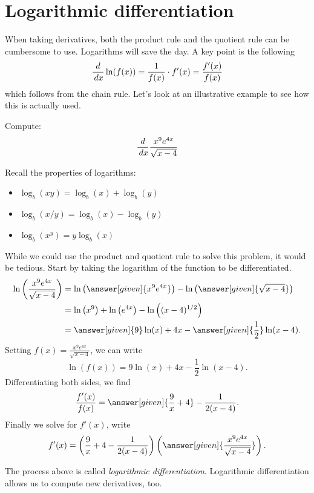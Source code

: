 \documentclass{ximera}
\begin{document}
\section{Logarithmic differentiation}


When taking derivatives, both the product rule and the quotient rule can be cumbersome to use. Logarithms will save the day. A key point is the following
\[ \frac{d}{\,d x} \ln(f(x)) = \frac{1}{f(x)}\cdot f'(x) = \frac{f'(x)}{f(x)} \]
which follows from the chain rule. Let's look at an illustrative example to see how this is actually used.

\begin{example} 
	Compute:
	\[
	\frac{d}{\,d x} \frac{x^9e^{4x}}{\sqrt{x-4}}
	\]
	\begin{explanation}
		Recall the properties of logarithms:
		\begin{itemize}
			\item $\log_b(xy) = \log_b(x) + \log_b(y)$
			\item $\log_b(x/y) = \log_b(x) - \log_b(y)$
			\item $\log_b(x^y) = y\log_b(x)$
		\end{itemize}
		
		While we could use the product and quotient rule to solve this
		problem, it would be tedious. Start by taking the logarithm of the
		function to be differentiated.
		\begin{align*}
			\ln\left(\frac{x^9e^{4x}}{\sqrt{x-4}} \right) &= \ln\left(\answer[given]{x^9e^{4x}}\right) - \ln\left(\answer[given]{\sqrt{x-4}}\right)\\
				&= \ln\left(x^9\right)+\ln\left(e^{4x}\right) - \ln\left((x-4)^{1/2}\right)\\
				&= \answer[given]{9}\ln(x)+4x - \answer[given]{\frac{1}{2}}\ln(x-4).
		\end{align*}
		Setting $f(x) = \frac{x^9e^{4x}}{\sqrt{x-4}}$, we can write
		\[ \ln(f(x)) = 9\ln(x)+4x - \frac{1}{2}\ln(x-4).\]
		Differentiating both sides, we find
		\[ \frac{f'(x)}{f(x)} = \answer[given]{\frac{9}{x}+4} - \frac{1}{2(x-4)}.\]
		Finally we solve for $f'(x)$, write
		\[f'(x) = \left(\frac{9}{x}+4 - \frac{1}{2(x-4)}\right)\left(\answer[given]{\frac{x^9e^{4x}}{\sqrt{x-4}}}\right). \]
	\end{explanation}
\end{example}

The process above is called \textit{logarithmic differentiation}. Logarithmic differentiation allows us to compute new derivatives, too.
\end{document}
